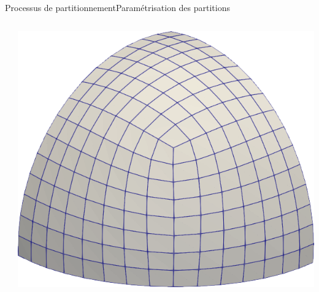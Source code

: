 \documentclass[compress,10pt,aspectratio=169]{beamer}
\begin{document}
\begin{frame}{Processus de partitionnement}{Paramétrisation des partitions}
{\begin{columns}
\begin{column}{0.4\textwidth}
\end{column}
\hspace{-0.5cm}
\begin{column}{0.4\textwidth}
\centering
\includegraphics[scale=0.22]{images/huit_quad.png}
\end{column}
\end{columns}
}
\end{frame}
\end{document}
